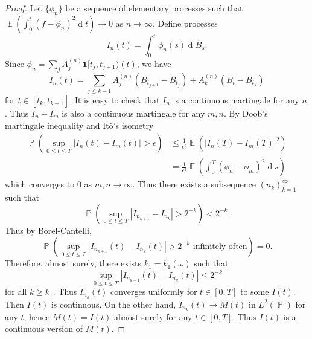 \documentclass[11pt, a4paper]{memoir}
\theoremstyle{change}
\theoremstyle{plain}
\theoremstyle{nonumberplain}
\newtheorem{proof}{Proof}
\DeclareMathOperator{\pr}{{\mathbb{P}}}
\DeclareMathOperator{\E}{{\mathbb{E}}}
\renewcommand{\d}[1]{\ensuremath{\operatorname{d}\!{#1}}}
\newcommand{\idc}{\mathbf{1}}
\numberwithin{equation}{section}
\begin{document}
\begin{proof}
    Let $\{\phi_n\}$ be a sequence of elementary processes such that $\E(\int_0^t(f-\phi_n)^2\d{t})\to 0$ as $n\to\infty$.
    Define processes
    \begin{equation*}
        I_n(t)=\int_0^t\phi_n(s)\d{B_s}.
    \end{equation*}
    Since $\phi_n=\sum_j A_j^{(n)}\idc{[t_j,t_{j+1})}(t)$, we have
    \begin{equation*}
        I_n(t)=\sum_{j\leq k-1}A_j^{(n)}(B_{t_{j+1}}-B_{t_j})+A_k^{(n)}(B_t-B_{t_k})
    \end{equation*}
    for $t\in[t_k,t_{k+1}]$.
    It is easy to check that $I_n$ is a continuous martingale for any $n$.
    Thus $I_n-I_m$ is also a continuous martingale for any $m,n$.
    By Doob's martingale inequality and Itô's isometry
    \begin{align*}
        \pr(\sup_{0\leq t\leq T}|I_n(t)-I_m(t)|>\epsilon) &\leq\frac{1}{\epsilon^2}\E(|I_n(T)-I_m(T)|^2)\\
                                                          &= \frac{1}{\epsilon^2}\E(\int_0^T(\phi_n-\phi_m)^2\d{s})
    \end{align*}
    which converges to $0$ as $m,n\to\infty$.
    Thus there exists a subsequence $(n_k)_{k=1}^\infty$ such that
    \begin{equation*}
        \pr(\sup_{0\leq t\leq T}|I_{n_{k+1}}-I_{n_k}|>2^{-k})<2^{-k}.
    \end{equation*}
    Thus by Borel-Cantelli,
    \begin{equation*}
        \pr(\sup_{0\leq t\leq T}|I_{n_{k+1}}(t)-I_{n_k}(t)|>2^{-k}\text{ infinitely often})=0.
    \end{equation*}
    Therefore, almost surely, there exists $k_1=k_1(\omega)$ such that
    \begin{equation*}
        \sup_{0\leq t\leq T}|I_{n_{k+1}}(t)-I_{n_k}(t)|\leq 2^{-k}
    \end{equation*}
    for all $k\geq k_1$.
    Thus $I_{n_k}(t)$ converges uniformly for $t\in[0,T]$ to some $I(t)$.
    Then $I(t)$ is continuous.
    On the other hand, $I_{n_k}(t)\to M(t)$ in $L^2(\pr)$ for any $t$, hence $M(t)=I(t)$ almost surely for any $t\in[0,T]$.
    Thus $I(t)$ is a continuous version of $M(t)$.


\end{proof}
\end{document}
